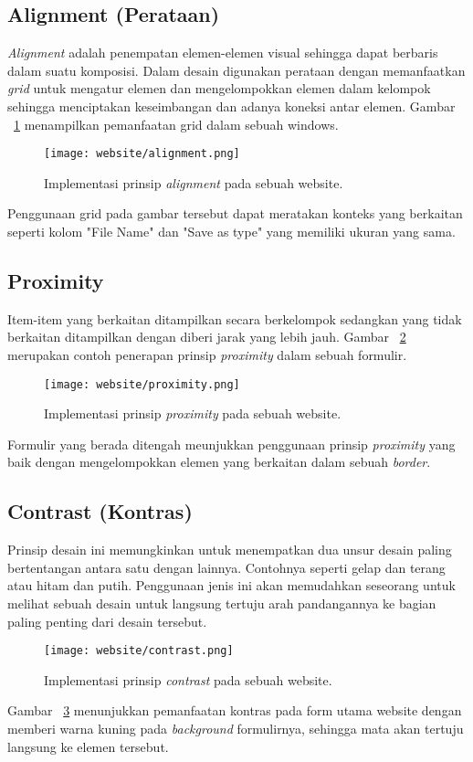 \subsection{Alignment (Perataan)}
\textit{Alignment} adalah penempatan elemen-elemen visual sehingga dapat berbaris dalam suatu komposisi. Dalam desain digunakan perataan dengan memanfaatkan \textit{grid} untuk mengatur elemen dan mengelompokkan elemen dalam kelompok sehingga menciptakan keseimbangan dan adanya koneksi antar elemen. Gambar ~\ref{fig:alignment} menampilkan pemanfaatan grid dalam sebuah windows.
\begin{figure} [H]
	\centering  
	\texttt{[image: website/alignment.png]}  
	\caption{Implementasi prinsip \textit{alignment} pada sebuah website.}
	\label{fig:alignment}	 
\end{figure}
\noindent Penggunaan grid pada gambar tersebut dapat meratakan konteks yang berkaitan seperti kolom "File Name" dan "Save as type" yang memiliki ukuran yang sama. 

\subsection{Proximity}
Item-item yang berkaitan ditampilkan secara berkelompok sedangkan yang tidak berkaitan ditampilkan dengan diberi jarak yang lebih jauh. Gambar ~\ref{fig:proximity} merupakan contoh penerapan prinsip \textit{proximity} dalam sebuah formulir.
\begin{figure} [H]
	\centering  
	\texttt{[image: website/proximity.png]}  
	\caption{Implementasi prinsip \textit{proximity} pada sebuah website.}
	\label{fig:proximity}	 
\end{figure}
\noindent Formulir yang berada ditengah meunjukkan penggunaan prinsip \textit{proximity} yang baik dengan mengelompokkan elemen yang berkaitan dalam sebuah \textit{border}.

\subsection{Contrast (Kontras)}
Prinsip desain ini memungkinkan untuk menempatkan dua unsur desain paling bertentangan antara satu dengan lainnya. Contohnya seperti gelap dan terang atau hitam dan putih. Penggunaan jenis ini akan memudahkan seseorang untuk melihat sebuah desain untuk langsung tertuju arah pandangannya ke bagian paling penting dari desain tersebut. 
\begin{figure} [H]
	\centering  
	\texttt{[image: website/contrast.png]}  
	\caption{Implementasi prinsip \textit{contrast} pada sebuah website.}
	\label{fig:contrast}	 
\end{figure}
\noindent Gambar ~\ref{fig:contrast} menunjukkan pemanfaatan kontras pada form utama website dengan memberi warna kuning pada \textit{background} formulirnya, sehingga mata akan tertuju langsung ke elemen tersebut.
